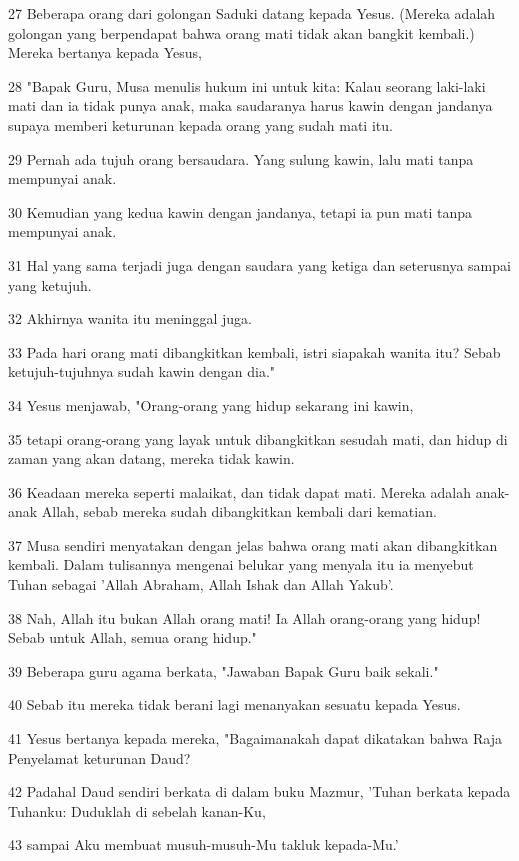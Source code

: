 \par 27 Beberapa orang dari golongan Saduki datang kepada Yesus. (Mereka adalah golongan yang berpendapat bahwa orang mati tidak akan bangkit kembali.) Mereka bertanya kepada Yesus,
\par 28 "Bapak Guru, Musa menulis hukum ini untuk kita: Kalau seorang laki-laki mati dan ia tidak punya anak, maka saudaranya harus kawin dengan jandanya supaya memberi keturunan kepada orang yang sudah mati itu.
\par 29 Pernah ada tujuh orang bersaudara. Yang sulung kawin, lalu mati tanpa mempunyai anak.
\par 30 Kemudian yang kedua kawin dengan jandanya, tetapi ia pun mati tanpa mempunyai anak.
\par 31 Hal yang sama terjadi juga dengan saudara yang ketiga dan seterusnya sampai yang ketujuh.
\par 32 Akhirnya wanita itu meninggal juga.
\par 33 Pada hari orang mati dibangkitkan kembali, istri siapakah wanita itu? Sebab ketujuh-tujuhnya sudah kawin dengan dia."
\par 34 Yesus menjawab, "Orang-orang yang hidup sekarang ini kawin,
\par 35 tetapi orang-orang yang layak untuk dibangkitkan sesudah mati, dan hidup di zaman yang akan datang, mereka tidak kawin.
\par 36 Keadaan mereka seperti malaikat, dan tidak dapat mati. Mereka adalah anak-anak Allah, sebab mereka sudah dibangkitkan kembali dari kematian.
\par 37 Musa sendiri menyatakan dengan jelas bahwa orang mati akan dibangkitkan kembali. Dalam tulisannya mengenai belukar yang menyala itu ia menyebut Tuhan sebagai 'Allah Abraham, Allah Ishak dan Allah Yakub'.
\par 38 Nah, Allah itu bukan Allah orang mati! Ia Allah orang-orang yang hidup! Sebab untuk Allah, semua orang hidup."
\par 39 Beberapa guru agama berkata, "Jawaban Bapak Guru baik sekali."
\par 40 Sebab itu mereka tidak berani lagi menanyakan sesuatu kepada Yesus.
\par 41 Yesus bertanya kepada mereka, "Bagaimanakah dapat dikatakan bahwa Raja Penyelamat keturunan Daud?
\par 42 Padahal Daud sendiri berkata di dalam buku Mazmur, 'Tuhan berkata kepada Tuhanku: Duduklah di sebelah kanan-Ku,
\par 43 sampai Aku membuat musuh-musuh-Mu takluk kepada-Mu.'
